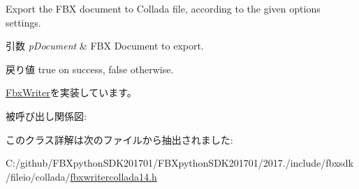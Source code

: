 Export the F\+BX document to Collada file, according to the given options settings. 
\begin{DoxyParams}{引数}
{\em p\+Document} & F\+BX Document to export. \\
\hline
\end{DoxyParams}
\begin{DoxyReturn}{戻り値}
true on success, false otherwise. 
\end{DoxyReturn}


\hyperlink{class_fbx_writer_aa8c0277611da0fdb0b9a184c55c30c2c}{Fbx\+Writer}を実装しています。

被呼び出し関係図\+:


このクラス詳解は次のファイルから抽出されました\+:\begin{DoxyCompactItemize}
\item 
C\+:/github/\+F\+B\+Xpython\+S\+D\+K201701/\+F\+B\+Xpython\+S\+D\+K201701/2017./include/fbxsdk/fileio/collada/\hyperlink{fbxwritercollada14_8h}{fbxwritercollada14.\+h}\end{DoxyCompactItemize}
